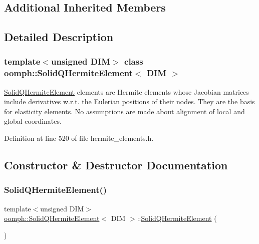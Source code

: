 \subsection*{Additional Inherited Members}


\subsection{Detailed Description}
\subsubsection*{template$<$unsigned D\+IM$>$\newline
class oomph\+::\+Solid\+Q\+Hermite\+Element$<$ D\+I\+M $>$}

\hyperlink{classoomph_1_1SolidQHermiteElement}{Solid\+Q\+Hermite\+Element} elements are Hermite elements whose Jacobian matrices include derivatives w.\+r.\+t. the Eulerian positions of their nodes. They are the basis for elasticity elements. No assumptions are made about alignment of local and global coordinates. 

Definition at line 520 of file hermite\+\_\+elements.\+h.



\subsection{Constructor \& Destructor Documentation}
\mbox{\label{classoomph_1_1SolidQHermiteElement_a9987624a5136fc97791ca0a6f168fc2d}} 
\subsubsection{\texorpdfstring{Solid\+Q\+Hermite\+Element()}{SolidQHermiteElement()}\hspace{0.1cm}{\footnotesize\ttfamily [1/2]}}
{\footnotesize\ttfamily template$<$unsigned D\+IM$>$ \\
\hyperlink{classoomph_1_1SolidQHermiteElement}{oomph\+::\+Solid\+Q\+Hermite\+Element}$<$ D\+IM $>$\+::\hyperlink{classoomph_1_1SolidQHermiteElement}{Solid\+Q\+Hermite\+Element} (\begin{DoxyParamCaption}{ }\end{DoxyParamCaption})\hspace{0.3cm}{\ttfamily [inline]}}



